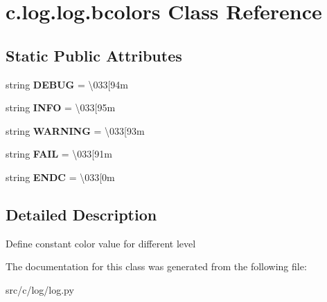 \hypertarget{classc_1_1log_1_1log_1_1bcolors}{}\section{c.\+log.\+log.\+bcolors Class Reference}
\label{classc_1_1log_1_1log_1_1bcolors}
\subsection*{Static Public Attributes}
\begin{DoxyCompactItemize}
\item 
\hypertarget{classc_1_1log_1_1log_1_1bcolors_ab95e6728b30c45a41111353127759a2d}{}string {\bfseries D\+E\+B\+U\+G} = \textquotesingle{}\textbackslash{}033\mbox{[}94m \textquotesingle{}\label{classc_1_1log_1_1log_1_1bcolors_ab95e6728b30c45a41111353127759a2d}

\item 
\hypertarget{classc_1_1log_1_1log_1_1bcolors_a273c7ed1c15b8f7dea1e4f0a0f031376}{}string {\bfseries I\+N\+F\+O} = \textquotesingle{} \textbackslash{}033\mbox{[}95m \textquotesingle{}\label{classc_1_1log_1_1log_1_1bcolors_a273c7ed1c15b8f7dea1e4f0a0f031376}

\item 
\hypertarget{classc_1_1log_1_1log_1_1bcolors_a2120304fbe2f5312261d53e30dc60e5a}{}string {\bfseries W\+A\+R\+N\+I\+N\+G} = \textquotesingle{} \textbackslash{}033\mbox{[}93m \textquotesingle{}\label{classc_1_1log_1_1log_1_1bcolors_a2120304fbe2f5312261d53e30dc60e5a}

\item 
\hypertarget{classc_1_1log_1_1log_1_1bcolors_ae13b8dac5d72e421a8e586bc5f6de577}{}string {\bfseries F\+A\+I\+L} = \textquotesingle{} \textbackslash{}033\mbox{[}91m \textquotesingle{}\label{classc_1_1log_1_1log_1_1bcolors_ae13b8dac5d72e421a8e586bc5f6de577}

\item 
\hypertarget{classc_1_1log_1_1log_1_1bcolors_af6732b73a64e30ca96a2572cdabf1c4d}{}string {\bfseries E\+N\+D\+C} = \textquotesingle{} \textbackslash{}033\mbox{[}0m \textquotesingle{}\label{classc_1_1log_1_1log_1_1bcolors_af6732b73a64e30ca96a2572cdabf1c4d}

\end{DoxyCompactItemize}


\subsection{Detailed Description}
\begin{DoxyVerb}Define constant color value for different level
\end{DoxyVerb}
 

The documentation for this class was generated from the following file\+:\begin{DoxyCompactItemize}
\item 
src/c/log/log.\+py\end{DoxyCompactItemize}

